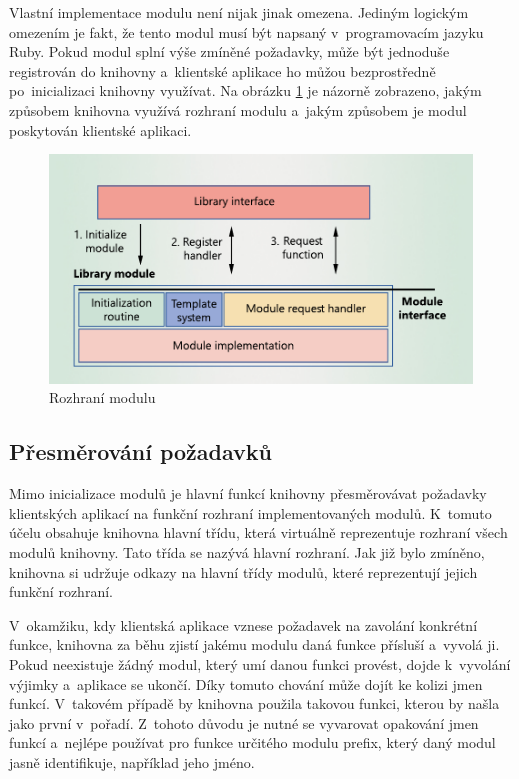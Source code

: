 Vlastní implementace modulu není nijak jinak omezena. Jediným logickým omezením je fakt, že tento modul musí být napsaný
v~programovacím jazyku Ruby. Pokud modul splní výše zmíněné požadavky, může být jednoduše registrován do knihovny a~klientské
aplikace ho můžou bezprostředně po~inicializaci knihovny využívat. Na obrázku \ref{figure:module:interface} je názorně zobrazeno, 
jakým způsobem knihovna využívá rozhraní modulu a~jakým způsobem je modul poskytován klientské aplikaci.
\begin{figure}[ht]
    \centering    
    \includegraphics[scale=0.7]{assets/pdfs/module_interface.pdf}
    \caption{Rozhraní modulu}
    \label{figure:module:interface}
\end{figure}
\subsection{Přesměrování požadavků}
\label{chapter:implementation:library:routing}
Mimo inicializace modulů je hlavní funkcí knihovny přesměrovávat požadavky klientských aplikací na funkční rozhraní 
implementovaných modulů. K~tomuto účelu obsahuje knihovna hlavní třídu, která virtuálně reprezentuje rozhraní všech modulů
knihovny. Tato třída se nazývá hlavní rozhraní. Jak již bylo zmíněno,
knihovna si udržuje odkazy na hlavní třídy modulů, které reprezentují jejich funkční rozhraní.

V~okamžiku, kdy klientská aplikace vznese požadavek na zavolání konkrétní funkce, knihovna za běhu zjistí jakému modulu daná
funkce přísluší a~vyvolá ji. Pokud neexistuje žádný modul, který umí danou funkci provést, dojde k~vyvolání výjimky a~aplikace
se ukončí. Díky tomuto chování může dojít ke kolizi jmen funkcí. V~takovém případě by knihovna použila takovou funkci, kterou
by našla jako první v~pořadí. Z~tohoto důvodu je nutné se vyvarovat opakování jmen funkcí a~nejlépe používat pro funkce určitého
modulu prefix, který daný modul jasně identifikuje, například jeho jméno.

